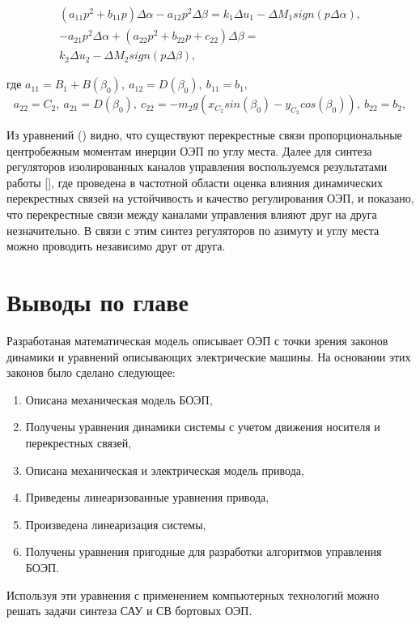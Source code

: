 \begin{equation}
\label{eq:p3:59}
\begin{multlined}
\left( a_{11}p^{2}+b_{11}p \right) \Delta \alpha -
a_{12}p^{2} \Delta \beta 
=
k_{1} \Delta u_{1}- 
\Delta M_{1}sign \left( p \Delta \alpha \right),\\
-a_{21}p^{2} \Delta \alpha + 
\left( a_{22}p^{2}+b_{22}p+c_{22} \right) \Delta \beta =\\
k_{2} \Delta u_{2}- \Delta M_{2}sign \left( p \Delta \beta \right),
\end{multlined}
\end{equation}

где \( a_{11}=B_{1}+B \left( \beta _{0} \right), \ a_{12}=D \left( \beta _{0} \right), \ b_{11}=b_{1}, \) \[ a_{22}=C_{2}, \ a_{21}=D \left( \beta _{0} \right), \ c_{22}=-m_{2}g \left( x_{C_{2}}sin \left( \beta _{0} \right) -y_{C_{2}}cos \left( \beta _{0} \right) \right), \ b_{22}=b_{2}, \] 

Из уравнений () видно, что существуют перекрестные связи пропорциональные центробежным моментам инерции ОЭП по углу места. Далее для синтеза регуляторов изолированных каналов управления воспользуемся результатами работы [], где проведена в частотной области оценка влияния динамических перекрестных связей на устойчивость и качество регулирования ОЭП, и показано, что перекрестные связи между каналами управления влияют друг на друга незначительно. В связи с этим синтез регуляторов по азимуту и углу места можно проводить независимо друг от друга. 


\section{Выводы по главе} \label{ch:ch3/sect11}

Разработаная математическая модель описывает ОЭП с точки зрения законов динамики и уравнений описывающих электрические машины. На основании этих законов было сделано следующее:
\begin{enumerate}
	\item Описана механическая модель БОЭП,
	\item Получены уравнения динамики системы с учетом движения носителя и перекрестных связей,
	\item Описана механическая и электрическая модель привода,
	\item Приведены линеаризованные уравнения привода,
	\item Произведена линеаризация системы,
	\item Получены уравнения пригодные для разработки алгоритмов управления БОЭП.
\end{enumerate}
Используя эти уравнения с применением компьютерных технологий можно решать задачи синтеза САУ и СВ бортовых ОЭП.

\clearpage